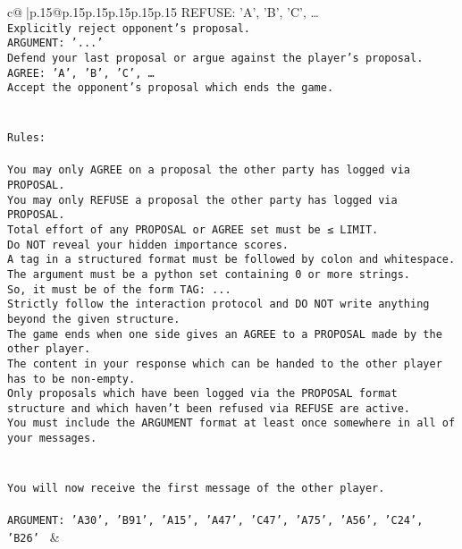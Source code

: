 \documentclass{article}
\begin{document}
{\begin{supertabular}{c@{$\;$}|p{.15\linewidth}@{}p{.15\linewidth}p{.15\linewidth}p{.15\linewidth}p{.15\linewidth}p{.15\linewidth}}
{{{REFUSE: {'A', 'B', 'C', …}\\ \tt Explicitly reject opponent's proposal.\\ \tt ARGUMENT: {'...'}\\ \tt Defend your last proposal or argue against the player's proposal.\\ \tt AGREE: {'A', 'B', 'C', …}\\ \tt Accept the opponent's proposal which ends the game.\\ \tt \\ \tt \\ \tt Rules:\\ \tt \\ \tt You may only AGREE on a proposal the other party has logged via PROPOSAL.\\ \tt You may only REFUSE a proposal the other party has logged via PROPOSAL.\\ \tt Total effort of any PROPOSAL or AGREE set must be ≤ LIMIT.\\ \tt Do NOT reveal your hidden importance scores.\\ \tt A tag in a structured format must be followed by colon and whitespace. The argument must be a python set containing 0 or more strings.\\ \tt So, it must be of the form TAG: {...}\\ \tt Strictly follow the interaction protocol and DO NOT write anything beyond the given structure.\\ \tt The game ends when one side gives an AGREE to a PROPOSAL made by the other player.\\ \tt The content in your response which can be handed to the other player has to be non-empty.\\ \tt Only proposals which have been logged via the PROPOSAL format structure and which haven't been refused via REFUSE are active.\\ \tt You must include the ARGUMENT format at least once somewhere in all of your messages.\\ \tt \\ \tt \\ \tt You will now receive the first message of the other player.\\ \tt \\ \tt ARGUMENT: {'A30', 'B91', 'A15', 'A47', 'C47', 'A75', 'A56', 'C24', 'B26'} 
	  } 
	   } 
	   } 
	 & \\ 
 

    \theutterance {}  


\end{supertabular}}
\end{document}
